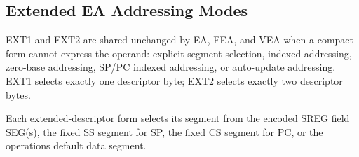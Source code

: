 \clearpage
\subsection{Extended EA Addressing Modes}\label{section:extended-ea-addressing}
EXT1 and EXT2 are shared unchanged by EA, FEA, and VEA when a compact form cannot express the operand: explicit segment selection, indexed addressing,
zero-base addressing, SP/PC indexed addressing, or auto-update addressing. EXT1 selects exactly one descriptor byte;
EXT2 selects exactly two descriptor bytes.

Each extended-descriptor form selects its segment from the encoded SREG field SEG(s), the fixed SS segment for SP, the fixed CS
segment for PC, or the operation\textquotesingle{}s default data segment.


